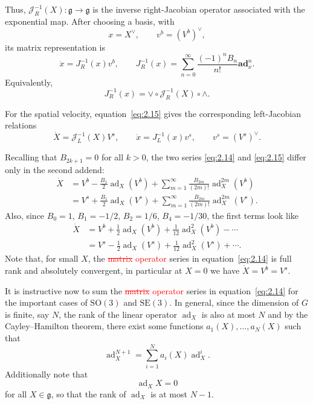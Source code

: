 \documentclass[11pt]{article}
\newcommand{\rev}[1]{\textcolor{red}{#1}}
\newcommand{\del}[1]{\textcolor{red}{\sout{#1}}}
\newenvironment{revision}{\color{red}}{}
\newcommand{\bad}{\mathbf{ad}}
\newcommand{\JopL}{\mathcal J_L}
\newcommand{\JopR}{\mathcal J_R}
\newcommand{\JL}{J_L}
\newcommand{\JR}{J_R}
\newcommand{\SO}{\mathrm{SO}}
\newcommand{\SE}{\mathrm{SE}}
\newcommand{\gfrak}{\mathfrak g}
\newcommand{\ad}{\operatorname{ad}}
\begin{document}
\begin{revision}
Thus, $\JopR^{-1}(X):\gfrak\to\gfrak$ is the inverse right-Jacobian
operator associated with the exponential map.  After choosing a basis,
with
\[
x=X^\vee,\qquad v^b=(V^b)^\vee,
\]
its matrix representation is
\[
\dot x=\JR^{-1}(x)v^b,\qquad
\JR^{-1}(x)
=
\sum_{n=0}^{\infty}
\frac{(-1)^nB_n}{n!}\bad_x^n.
\]
Equivalently,
\[
\JR^{-1}(x)
=
\vee\circ\JopR^{-1}(X)\circ\wedge.
\]

For the spatial velocity, equation~\eqref{eq:2.15} gives the corresponding
left-Jacobian relations
\[
\dot X=\JopL^{-1}(X)V^s,
\qquad
\dot x=\JL^{-1}(x)v^s,
\qquad
v^s=(V^s)^\vee.
\]
\end{revision}

Recalling that $B_{2k+1}=0$ for all $k>0$, the two series \eqref{eq:2.14} and \eqref{eq:2.15} differ only in the second addend:
\begin{align*}
\dot X&=V^b-\frac{B_1}{2}\ad_X(V^b)+\sum_{m=1}^{\infty}\frac{B_{2m}}{(2m)!}\ad_X^{2m}(V^b)\\
&=V^s+\frac{B_1}{2}\ad_X(V^s)+\sum_{m=1}^{\infty}\frac{B_{2m}}{(2m)!}\ad_X^{2m}(V^s).
\end{align*}
Also, since $B_0=1$, $B_1=-1/2$, $B_2=1/6$, $B_4=-1/30$, the first terms look like
\begin{align*}
\dot X&=V^b+\frac12\ad_X(V^b)+\frac1{12}\ad_X^2(V^b)-\cdots\\
&=V^s-\frac12\ad_X(V^s)+\frac1{12}\ad_X^2(V^s)+\cdots.
\end{align*}
Note that, for small $X$, the \del{matrix} \rev{operator} series in equation~\eqref{eq:2.14} is full rank and absolutely convergent, in particular at $X=0$ we have $\dot X=V^b=V^s$.

It is instructive now to sum the \del{matrix} \rev{operator} series in equation~\eqref{eq:2.14} for the important cases of $\SO(3)$ and $\SE(3)$. In general, since the dimension of $G$ is finite, say $N$, the rank of the linear operator $\ad_X$ is also at most $N$ and by the Cayley--Hamilton theorem, there exist some functions $a_1(X),\ldots,a_N(X)$ such that
\begin{equation*}
\ad_X^{N+1}=\sum_{i=1}^N a_i(X)\ad_X^i.\tag{2.17}\label{eq:2.17}
\end{equation*}
Additionally note that
\begin{equation*}
\ad_XX=0\tag{2.18}\label{eq:2.18}
\end{equation*}
for all $X\in\gfrak$, so that the rank of $\ad_X$ is at most $N-1$.
\end{document}
